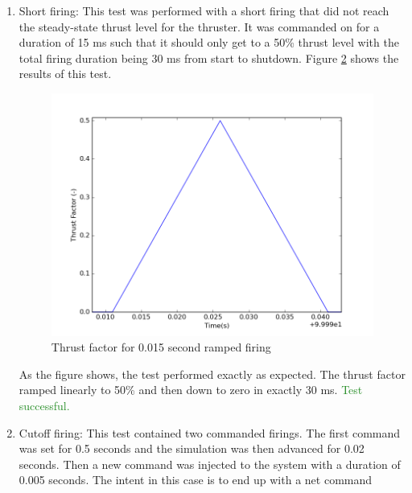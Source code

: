\documentclass[]{LASPreport}
\begin{document}
{\begin{enumerate}
{\begin{figure}[htb]
{            }
            \caption{Thrust factor for 0.5 second ramped firing}
            \label{fig:first_ramp_fir}
    \end{figure}
    As this figure shows, both the startup and shutdown transients ramped 
    according to the expected profile and both were checked to ensure that 
    they took the expected 30 ms to ramp. 
    \textcolor{ForestGreen}{Test successful.}
}
\item{Short firing:  This test was performed with a short firing that did not 
    reach the steady-state thrust level for the thruster.  It was commanded on 
    for a duration of 15 ms such that it should only get to a 50\% thrust level 
    with the total firing duration being 30 ms from start to shutdown.  Figure 
    \ref{fig:short_ramp_fir} shows the results of this test.
    \begin{figure}[htb]
            \centerline{
            \includegraphics[scale=0.5]{Figures/shortRampFiring}
            }
            \caption{Thrust factor for 0.015 second ramped firing}
            \label{fig:short_ramp_fir}
    \end{figure}
    As the figure shows, the test performed exactly as expected.  The thrust 
    factor ramped linearly to 50\% and then down to zero in exactly 30 ms.  
    	\textcolor{ForestGreen}{Test successful.}
}
\item{Cutoff firing:  This test contained two commanded firings.  The first 
    command was set for 0.5 seconds and the simulation was then advanced for 
    0.02 seconds.  Then a new command was injected to the system with a duration 
    of 0.005 seconds.  The intent in this case is to end up with a net command 
}
\end{enumerate}}
\end{document}
